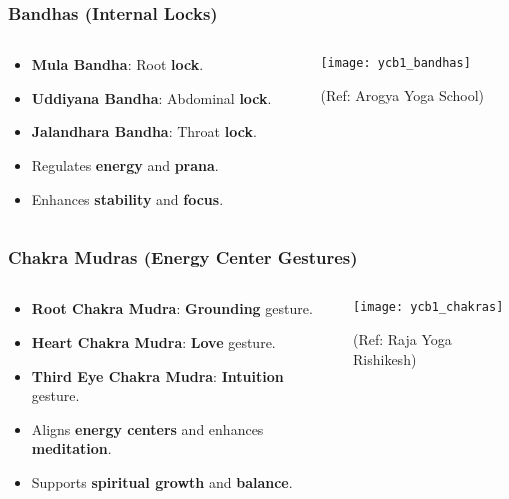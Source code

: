 \begin{frame}[fragile]\frametitle{Bandhas (Internal Locks)}
\begin{columns}
    \begin{column}[T]{0.5\linewidth}
      \begin{itemize}
        \item \textbf{Mula Bandha}: Root \textbf{lock}.
        \item \textbf{Uddiyana Bandha}: Abdominal \textbf{lock}.
        \item \textbf{Jalandhara Bandha}: Throat \textbf{lock}.
        \item Regulates \textbf{energy} and \textbf{prana}.
        \item Enhances \textbf{stability} and \textbf{focus}.
      \end{itemize}
    \end{column}
    \begin{column}[T]{0.5\linewidth}
        \begin{center}
        \texttt{[image: ycb1\_bandhas]}
				
		{\tiny (Ref: Arogya Yoga School)}	 
        \end{center}	
    \end{column}
\end{columns}
\end{frame}

\begin{frame}[fragile]\frametitle{Chakra Mudras (Energy Center Gestures)}
\begin{columns}
    \begin{column}[T]{0.5\linewidth}
      \begin{itemize}
        \item \textbf{Root Chakra Mudra}: \textbf{Grounding} gesture.
        \item \textbf{Heart Chakra Mudra}: \textbf{Love} gesture.
        \item \textbf{Third Eye Chakra Mudra}: \textbf{Intuition} gesture.
        \item Aligns \textbf{energy centers} and enhances \textbf{meditation}.
        \item Supports \textbf{spiritual growth} and \textbf{balance}.
      \end{itemize}
    \end{column}
    \begin{column}[T]{0.5\linewidth}
        \begin{center}
        \texttt{[image: ycb1\_chakras]}
				
		{\tiny (Ref: Raja Yoga Rishikesh)}	 
        \end{center}	
    \end{column}
\end{columns}
\end{frame}


